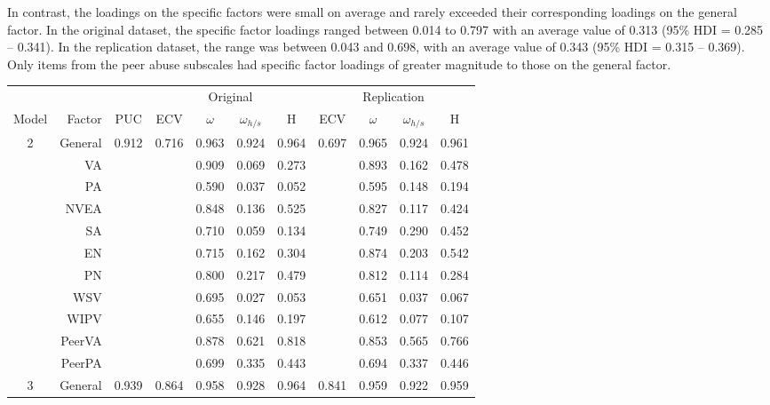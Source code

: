 \documentclass[letterpaper,man,natbib,longtable,floatsintext,12pt]{apa6}
\begin{document}
In contrast, the loadings on the specific factors were small on average and rarely exceeded their corresponding loadings on the general factor. In the original dataset, the specific factor loadings ranged between 0.014 to 0.797 with an average value of 0.313 (95\% HDI = 0.285 -- 0.341). In the replication dataset, the range was between 0.043 and 0.698, with an average value of 0.343 (95\% HDI = 0.315 -- 0.369). Only items from the peer abuse subscales had specific factor loadings of greater magnitude to those on the general factor.

\begin{table}[t!]
\centering
\begin{tabular*}{\textwidth}{crccccccccc}
\toprule
& & & \multicolumn{4}{c}{Original} & \multicolumn{4}{c}{Replication} \\
\cmidrule(lr){4-7}\cmidrule(lr){8-11}
Model & Factor & PUC & ECV & $\omega$ & $\omega_{h/s}$ & H & ECV & $\omega$ & $\omega_{h/s}$ & H \\
\midrule
2 & General &  0.912 & 0.716 &  0.963 &   0.924 &  0.964 & 0.697 & 0.965 & 0.924 & 0.961 \\
& VA        &        &       &  0.909 &   0.069 &  0.273 &       & 0.893 & 0.162 & 0.478 \\
& PA        &        &       &  0.590 &   0.037 &  0.052 &       & 0.595 & 0.148 & 0.194 \\
& NVEA      &        &       &  0.848 &   0.136 &  0.525 &       & 0.827 & 0.117 & 0.424 \\
& SA        &        &       &  0.710 &   0.059 &  0.134 &       & 0.749 & 0.290 & 0.452 \\
& EN        &        &       &  0.715 &   0.162 &  0.304 &       & 0.874 & 0.203 & 0.542 \\
& PN        &        &       &  0.800 &   0.217 &  0.479 &       & 0.812 & 0.114 & 0.284 \\
& WSV       &        &       &  0.695 &   0.027 &  0.053 &       & 0.651 & 0.037 & 0.067 \\
& WIPV      &        &       &  0.655 &   0.146 &  0.197 &       & 0.612 & 0.077 & 0.107 \\
& PeerVA    &        &       &  0.878 &   0.621 &  0.818 &       & 0.853 & 0.565 & 0.766 \\
& PeerPA    &        &       &  0.699 &   0.335 &  0.443 &       & 0.694 & 0.337 & 0.446 \\
\midrule
3 & General &  0.939 & 0.864 &  0.958 &   0.928 &  0.964 & 0.841 & 0.959 & 0.922 & 0.959 \\

\end{tabular*}
\end{table}
\end{document}
